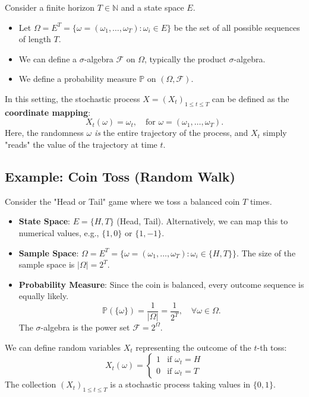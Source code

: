Consider a finite horizon $T \in \mathbb{N}$ and a state space $E$.
\begin{itemize}
    \item Let $\Omega = E^T = \{ \omega = (\omega_1, \dots, \omega_T) : \omega_i \in E \}$ be the set of all possible sequences of length $T$.
    \item We can define a $\sigma$-algebra $\mathcal{F}$ on $\Omega$, typically the product $\sigma$-algebra.
    \item We define a probability measure $\mathbb{P}$ on $(\Omega, \mathcal{F})$.
\end{itemize}

In this setting, the stochastic process $X = (X_t)_{1 \leq t \leq T}$ can be defined as the \textbf{coordinate mapping}:
\[
X_t(\omega) = \omega_t, \quad \text{for } \omega = (\omega_1, \dots, \omega_T).
\]
Here, the randomness $\omega$ \textit{is} the entire trajectory of the process, and $X_t$ simply "reads" the value of the trajectory at time $t$.

\subsection{Example: Coin Toss (Random Walk)}

Consider the "Head or Tail" game where we toss a balanced coin $T$ times.
\begin{itemize}
    \item \textbf{State Space}: $E = \{H, T\}$ (Head, Tail). Alternatively, we can map this to numerical values, e.g., $\{1, 0\}$ or $\{1, -1\}$.
    \item \textbf{Sample Space}: $\Omega = E^T = \{ \omega = (\omega_1, \dots, \omega_T) : \omega_i \in \{H, T\} \}$. The size of the sample space is $|\Omega| = 2^T$.
    \item \textbf{Probability Measure}: Since the coin is balanced, every outcome sequence is equally likely.
    \[
    \mathbb{P}(\{\omega\}) = \frac{1}{|\Omega|} = \frac{1}{2^T}, \quad \forall \omega \in \Omega.
    \]
    The $\sigma$-algebra is the power set $\mathcal{F} = 2^\Omega$.
\end{itemize}

We can define random variables $X_t$ representing the outcome of the $t$-th toss:
\[
X_t(\omega) = \begin{cases} 1 & \text{if } \omega_t = H \\ 0 & \text{if } \omega_t = T \end{cases}
\]
The collection $(X_t)_{1 \leq t \leq T}$ is a stochastic process taking values in $\{0, 1\}$.

